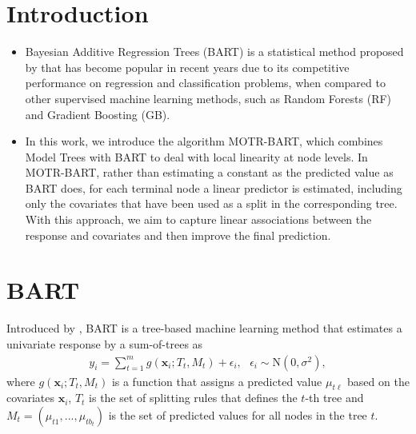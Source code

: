 \documentclass[
    ,title     = {{Bayesian Additive Regression Trees with Model Trees}}
    ,author    = {{Estevao B. Prado}}
    ,subject   = {{This is the subject of my work}}
   ,toplogo   = {{header_poster}}
,longtitle
]{dtuposter}
\begin{document}
%
%
\begin{dtuposterhead} %
\end{dtuposterhead}
%
%
\begin{dtupostercontent}
\section{Introduction}

\begin{itemize}
    \item Bayesian Additive Regression Trees (BART) is a statistical method proposed by \cite{chipman2010bart} that has become popular in recent years due to its competitive performance on regression and classification problems, when compared to other supervised machine learning methods, such as Random Forests (RF) and Gradient Boosting (GB).

     \item In this work, we introduce the algorithm MOTR-BART, which combines Model Trees \cite{quinlan1992learning} with BART to deal with local linearity at node levels. In MOTR-BART, rather than estimating a constant as the predicted value as BART does, for each terminal node a linear predictor is estimated, including only the covariates that have been used as a split in the corresponding tree. With this approach, we aim to capture linear associations between the response and covariates and then improve the final prediction.
\end{itemize}

\section{BART}
Introduced by \cite{chipman2010bart}, BART is a tree-based machine learning method that estimates a univariate response by a sum-of-trees as
$$
\begin{aligned}
y_{i} = \sum_{t = 1}^{m} g(\textbf{x}_{i}; T_{t}, M_{t}) + \epsilon_{i}, \mbox{ } \epsilon_{i} \sim \mbox{N}(0, \sigma^{2}),
\end{aligned}
$$
where $g(\textbf{x}_{i}; T_{t}, M_{t})$ is a function that assigns a predicted value $\mu_{t \ell}$ based on the covariates $\textbf{x}_{i}$, $T_{t}$ is the set of splitting rules that defines the $t$-th tree and $M_{t} = (\mu_{t1}, ..., \mu_{t b_{t}})$ is the set of predicted values for all nodes in the tree $t$.


\end{dtupostercontent}
\end{document}
